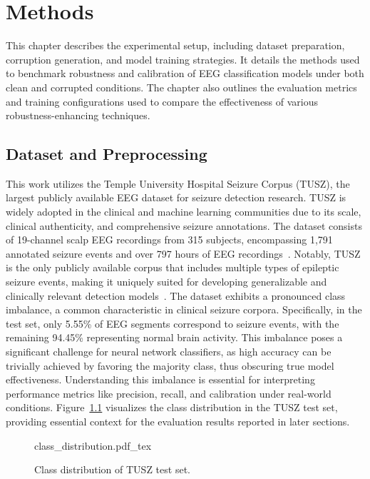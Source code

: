 
\chapter{Methods}
\label{ch:methodology}
This chapter describes the experimental setup, including dataset preparation, corruption generation, and model training strategies. It details the methods used to benchmark robustness and calibration of EEG classification models under both clean and corrupted conditions. The chapter also outlines the evaluation metrics and training configurations used to compare the effectiveness of various robustness-enhancing techniques.

\section{Dataset and Preprocessing}
This work utilizes the Temple University Hospital Seizure Corpus (TUSZ), the largest publicly available EEG dataset for seizure detection research. TUSZ is widely adopted in the clinical and machine learning communities due to its scale, clinical authenticity, and comprehensive seizure annotations. The dataset consists of 19-channel scalp EEG recordings from 315 subjects, encompassing 1,791 annotated seizure events and over 797 hours of EEG recordings~\cite{seizureTUSZ}. Notably, TUSZ is the only publicly available corpus that includes multiple types of epileptic seizure events, making it uniquely suited for developing generalizable and clinically relevant detection models~\cite{seizureTUSZ}. The dataset exhibits a pronounced class imbalance, a common characteristic in clinical seizure corpora. Specifically, in the test set, only 5.55\% of EEG segments correspond to seizure events, with the remaining 94.45\% representing normal brain activity. This imbalance poses a significant challenge for neural network classifiers, as high accuracy can be trivially achieved by favoring the majority class, thus obscuring true model effectiveness. Understanding this imbalance is essential for interpreting performance metrics like precision, recall, and calibration under real-world conditions. Figure~\ref{fig:class_distribution} visualizes the class distribution in the TUSZ test set, providing essential context for the evaluation results reported in later sections.

\begin{figure}[h]
	\centering
    \def\svgwidth{300pt}
 	{class_distribution.pdf_tex} 	 	
	\caption[Class distribution of test set]{Class distribution of TUSZ test set.}
	\label{fig:class_distribution}
\end{figure}

